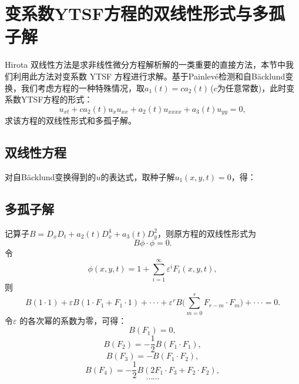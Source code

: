 \documentclass[11pt,a4paper]{ctexart}
\begin{document}
\section{变系数YTSF方程的双线性形式与多孤子解}

Hirota 双线性方法是求非线性微分方程解析解的一类重要的直接方法，本节中我们利用此方法对变系数 YTSF 方程进行求解。基于Painlev\'{e}检测和自B\"{a}cklund变换，我们考虑方程\label{2y}的一种特殊情况，取$a_1(t)=ca_2(t)$\,($c$为任意常数)，此时变系数YTSF方程的形式：
\begin{equation}
    u_{xt}+ca_2(t)u_xu_{xx}+a_2(t)u_{xxxx}+a_3(t)u_{yy}=0,\label{3tsy}
\end{equation}
求该方程的双线性形式和多孤子解。
\subsection{双线性方程}
对自B\"{a}cklund变换得到的$u$的表达式，取种子解$u_1(x,y,t)=0$，得：


\subsection{多孤子解}
记算子$B=D_xD_t+a_2(t)D_x^4+a_3(t)D_y^2$，则原方程的双线性形式为
\begin{equation}
    B\phi \cdot \phi=0.
\end{equation}
令
\begin{equation}
    \phi(x,y,t)=1+\sum_{i=1}^{\infty}\varepsilon^iF_i(x,y,t),
\end{equation}
则
\begin{equation}
    B(1\cdot 1)+\varepsilon B(1\cdot F_1+F_1\cdot 1)+\cdot \cdot \cdot+\varepsilon^rB\bigg(\sum_{m=0}^{r}F_{r-m}\cdot F_m \bigg)+\cdot \cdot \cdot=0.
\end{equation}
令$\varepsilon$ 的各次幂的系数为零，可得：
\begin{equation}
    B(F_1)=0,\label{3s1}
\end{equation}
\begin{equation}
    B(F_2)=-\frac{1}{2}B(F_1 \cdot F_1),\label{3s2}
\end{equation}
\begin{equation}
    B(F_3)=-B(F_1 \cdot F_2),\label{3s3}
\end{equation}
\begin{equation}
    B(F_4)=-\frac{1}{2}B(2F_1 \cdot F_3+F_2 \cdot F_2),
\end{equation}
\begin{equation*}
    \cdots \cdots
\end{equation*}
\end{document}
